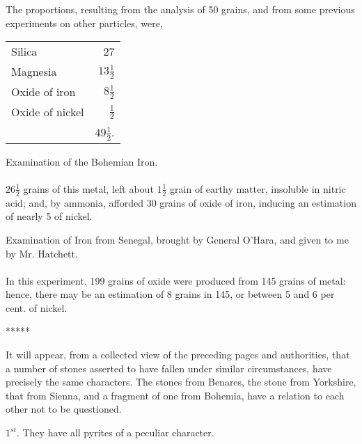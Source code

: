 \documentclass[a4paper, 12pt, oneside]{article}
\begin{document}
The proportions, resulting from the analysis of 50 grains, and from some previous experiments on other particles, were,
\begin{table}[H]
    \centering
    \begin{tabular}{l r}
        Silica & 27 \\
        Magnesia & $13\frac{1}{2}$ \\ 
        Oxide of iron & $8\frac{1}{2}$ \\
        Oxide of nickel & $\frac{1}{2}$ \\ \hline
        ~ & $49\frac{1}{2}$. \\
    \end{tabular}
\end{table}
\begin{center}
Examination of the Bohemian Iron.
\end{center}
\paragraph{}
$26\frac{1}{2}$ grains of this metal, left about $1\frac{1}{2}$ grain of earthy matter, insoluble in nitric acid; and, by ammonia, afforded 30 grains of oxide of iron, inducing an estimation of nearly 5 of nickel.
\begin{center}
Examination of Iron from Senegal, brought by General O'Hara, and given to me by Mr. Hatchett.
\end{center}
\paragraph{}
In this experiment, 199 grains of oxide were produced from 145 grains of metal: hence, there may be an estimation of 8 grains in 145, or between 5 and 6 per cent. of nickel.

\centerline{*\hspace{15mm}*\hspace{15mm}*\hspace{15mm}*\hspace{15mm}*}
\bigskip

It will appear, from a collected view of the preceding pages and authorities, that a number of stones asserted to have fallen under similar circumstances, have precisely the same characters. The stones from Benares, the stone from Yorkshire, that from Sienna, and a fragment of one from Bohemia, have a relation to each other not to be questioned.

$1^{st}$. They have all pyrites of a peculiar character.
\end{document}
